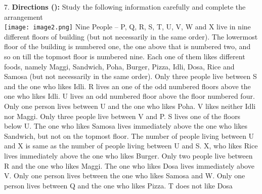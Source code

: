 \documentclass[
]{article}
\begin{document}
7. \textbf{Directions ():} Study the following information carefully and complete the arrangement\\
\texttt{[image: image2.png]}
Nine People – P, Q, R, S, T, U, V, W and X live in nine different floors of building (but not
necessarily in the same order). The lowermost floor of the building is numbered one, the one
above that is numbered two, and so on till the topmost floor is numbered nine. Each one of
them likes different foods, namely Maggi, Sandwich, Poha, Burger, Pizza, Idli, Dosa, Rice
and Samosa (but not necessarily in the same order). Only three people live between S and
the one who likes Idli. R lives an one of the odd numbered floors above the one who likes
Idli. U lives an odd numbered floor above the floor numbered four. Only one person lives
between U and the one who likes Poha. V likes neither Idli nor Maggi. Only three people
live between V and P. S lives one of the floors below U. The one who likes Samosa lives
immediately above the one who likes Sandwich, but not on the topmost floor. The number
of people living between U and X is same as the number of people living between U and S.
X, who likes Rice lives immediately above the one who likes Burger. Only two people live
between R and the one who likes Maggi. The one who likes Dosa lives immediately above
V. Only one person lives between the one who likes Samosa and W. Only one person lives
between Q and the one who likes Pizza. T does not like Dosa\\
\end{document}
